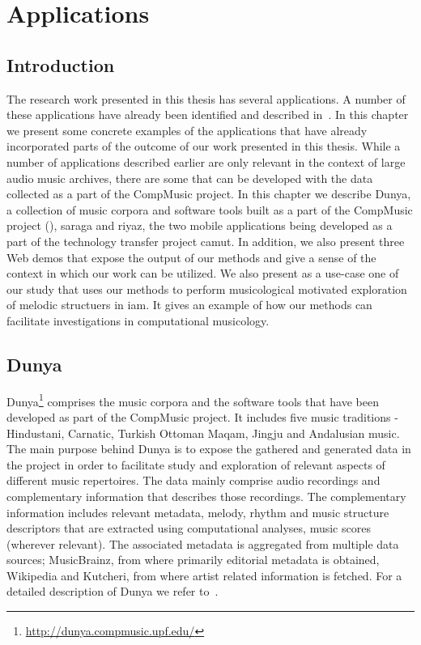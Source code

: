 
\chapter{Applications}
\label{chap:applicatoins}

\section{Introduction}
\label{sec:applications_introduction}

The research work presented in this thesis has several applications. A number of these applications have already been identified and described in~. In this chapter we present some concrete examples of the applications that have already incorporated parts of the outcome of our work presented in this thesis. While a number of applications described earlier are only relevant in the context of large audio music archives, there are some that can be developed with the data collected as a part of the CompMusic project. In this chapter we describe Dunya, a collection of music corpora and software tools built as a part of the CompMusic project (), \Gls{saraga} and \Gls{riyaz}, the two mobile applications being developed as a part of the technology transfer project \gls{camut}. In addition, we also present three Web demos that expose the output of our methods and give a sense of the context in which our work can be utilized. We also present as a use-case one of our study that uses our methods to perform musicological motivated exploration of melodic structuers in \gls{iam}. It gives an example of how our methods can facilitate investigations in computational musicology. 

\section{Dunya}
\label{sec:applications_dunya}

Dunya\footnote{\url{http://dunya.compmusic.upf.edu/}} comprises the music corpora and the software tools that have been developed as part of the CompMusic project. It includes five music traditions - Hindustani, Carnatic, Turkish Ottoman Maqam, Jingju and Andalusian music. The main purpose behind Dunya is to expose the gathered and generated data in the project in order to facilitate study and exploration of relevant aspects of different music repertoires. The data mainly comprise audio recordings and complementary information that describes those recordings. The complementary information includes relevant metadata, melody, rhythm and music structure descriptors  that are extracted using computational analyses, music scores (wherever relevant). The associated metadata is aggregated from multiple data sources; MusicBrainz, from where primarily editorial metadata is obtained, Wikipedia and Kutcheri, from where artist related information is fetched. For a detailed description of Dunya we refer to~\cite{dunya_porter}.

